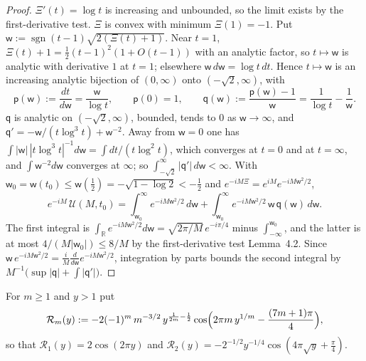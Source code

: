 \documentclass[11pt,reqno]{amsart}
\makeatletter
\let\CG@origcite\cite
\renewcommand*{\cite}[2][]{\def\CG@citekey{#2}%
  \ifx\relax#1\relax\CG@origcite{#2}\else\CG@origcite[#1]{#2}\fi}
\numberwithin{equation}{section}
\theoremstyle{plain}
\theoremstyle{definition}
\theoremstyle{remark}
\newcommand{\R}{\mathbb R}
\makeatother
\begin{document}
\begin{proof}
$\varXi'(t)=\log t$ is increasing and unbounded, so the limit exists by the first-derivative test.  $\varXi$ is convex with minimum $\varXi(1)=-1$.  Put $\mathsf w:=\operatorname{sgn}(t-1)\sqrt{2(\varXi(t)+1)}$.  Near $t=1$, $\varXi(t)+1=\frac12(t-1)^2(1+O(t-1))$ with an analytic factor, so $t\mapsto\mathsf w$ is analytic with derivative $1$ at $t=1$; elsewhere $\mathsf w\,d\mathsf w=\log t\,dt$.  Hence $t\mapsto\mathsf w$ is an increasing analytic bijection of $(0,\infty)$ onto $(-\sqrt2,\infty)$, with
\begin{equation}\label{eq:U-substitution}
 \mathsf p(\mathsf w):=\frac{dt}{d\mathsf w}=\frac{\mathsf w}{\log t},\qquad \mathsf p(0)=1,\qquad \mathsf q(\mathsf w):=\frac{\mathsf p(\mathsf w)-1}{\mathsf w}=\frac1{\log t}-\frac1{\mathsf w}.
\end{equation}
$\mathsf q$ is analytic on $(-\sqrt2,\infty)$, bounded, tends to $0$ as $\mathsf w\to\infty$, and $\mathsf q'=-\mathsf w/(t\log^3t)+\mathsf w^{-2}$.  Away from $\mathsf w=0$ one has $\int|\mathsf w|\,|t\log^3t|^{-1}d\mathsf w=\int dt/(t\log^2t)$, which converges at $t=0$ and at $t=\infty$, and $\int\mathsf w^{-2}d\mathsf w$ converges at $\infty$; so $\int_{-\sqrt2}^\infty|\mathsf q'|\,d\mathsf w<\infty$.  With $\mathsf w_0=\mathsf w(t_0)\le\mathsf w(\frac12)=-\sqrt{1-\log2}<-\frac12$ and $e^{-iM\varXi}=e^{iM}e^{-iM\mathsf w^2/2}$,
\begin{equation}\label{eq:U-split}
 e^{-iM}\,\mathcal U(M,t_0)=\int_{\mathsf w_0}^\infty e^{-iM\mathsf w^2/2}\,d\mathsf w+\int_{\mathsf w_0}^\infty e^{-iM\mathsf w^2/2}\,\mathsf w\,\mathsf q(\mathsf w)\,d\mathsf w .
\end{equation}
The first integral is $\int_{\R}e^{-iM\mathsf w^2/2}d\mathsf w=\sqrt{2\pi/M}\,e^{-i\pi/4}$ minus $\int_{-\infty}^{\mathsf w_0}$, and the latter is at most $4/(M|\mathsf w_0|)\le8/M$ by the first-derivative test \cite[Lemma~4.2]{Titchmarsh1986}.  Since $\mathsf w\,e^{-iM\mathsf w^2/2}=\frac iM\frac d{d\mathsf w}e^{-iM\mathsf w^2/2}$, integration by parts bounds the second integral by $M^{-1}\bigl(\sup|\mathsf q|+\int|\mathsf q'|\bigr)$.
\end{proof}

For $m\ge1$ and $y>1$ put
\begin{equation}\label{eq:clock-harmonic}
 \mathcal R_m(y):=-2(-1)^m\,m^{-3/2}\,y^{\frac1{2m}-\frac12}\cos\Bigl(2\pi m\,y^{1/m}-\frac{(7m+1)\pi}4\Bigr),
\end{equation}
so that $\mathcal R_1(y)=2\cos(2\pi y)$ and $\mathcal R_2(y)=-2^{-1/2}y^{-1/4}\cos(4\pi\sqrt y+\frac\pi4)$.
\end{document}
